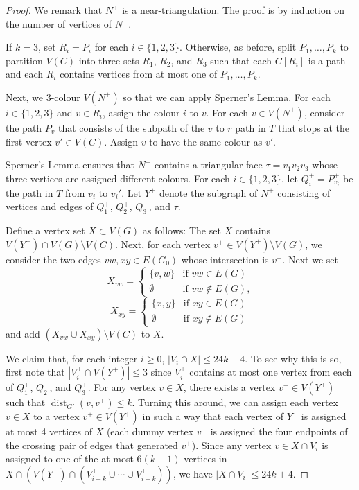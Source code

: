 \documentclass{patmorin}
\DeclareMathOperator{\dist}{dist}
\begin{document}
\begin{proof}
  We remark that $N^+$ is a near-triangulation.
  The proof is by induction on the number of vertices of $N^+$.

  If $k=3$, set $R_i=P_i$ for each $i\in\{1,2,3\}$.  Otherwise, as before, split $P_1,\ldots,P_k$ to partition $V(C)$ into three sets $R_1$, $R_2$, and $R_3$ such that each $C[R_i]$ is a path and each $R_i$ contains vertices from at most one of $P_1,\ldots,P_k$. 
  
  Next, we 3-colour $V(N^+)$ so that we can apply Sperner's Lemma.
  For each $i\in\{1,2,3\}$ and $v\in R_i$, assign the colour $i$ to $v$.
  For each $v\in V(N^+)$, consider the path $P_v$ that consists of the subpath of the $v$ to $r$ path in $T$ that stops at the first vertex $v'\in V(C)$. Assign $v$ to have the same colour as $v'$.
  
  Sperner's Lemma ensures that $N^+$ contains a triangular face $\tau=v_1v_2v_3$ whose three vertices are assigned different colours. For each $i\in\{1,2,3\}$, let $Q_i^+=P_{v_i}^+$ be the path in $T$ from $v_i$ to $v_i'$.  Let $Y^+$ denote the subgraph of $N^+$ consisting of vertices and edges of $Q_1^+$, $Q_2^+$, $Q_3^+$, and $\tau$.
  
  Define a vertex set $X\subset V(G)$ as follows:  The set $X$ contains $V(Y^+)\cap V(G)\setminus V(C)$.  Next, for each vertex $v^+\in V(Y^+)\setminus V(G)$, we consider the two edges $vw,xy\in E(G_0)$ whose intersection is $v^+$.  Next we set
  \[   X_{vw} = \begin{cases} \{v,w\} & \text{if $vw\in E(G)$} \\
           \emptyset & \text{if $vw\not\in E(G)$,}
         \end{cases}
  \]
  \[   X_{xy} = \begin{cases} \{x,y\} & \text{if $xy\in E(G)$} \\
           \emptyset & \text{if $xy\not\in E(G)$} 
         \end{cases}
  \]
  and add $(X_{vw}\cup X_{xy})\setminus V(C)$ to $X$.

  We claim that, for each integer $i\ge 0$, $|V_i\cap X|\le 24k+4$.  To see why this is so, first note that $|V_i^+\cap V(Y^+)|\le 3$ since $V_i^+$ contains at most one vertex from each of $Q_1^+$, $Q_2^+$, and $Q_3^+$. For any vertex $v\in X$, there exists a vertex $v^+\in V(Y^+)$ such that $\dist_{G'}(v,v^+)\le k$.  Turning this around, we can assign each vertex $v\in X$ to a vertex $v^+\in V(Y^+)$ in such a way that each vertex of $Y^+$ is assigned at most 4 vertices of $X$ (each dummy vertex $v^+$ is assigned the four endpoints of the crossing pair of edges that generated $v^+$).  Since any vertex $v\in X\cap V_i$ is assigned to one of the at most $6(k+1)$ vertices in $X\cap (V(Y^+)\cap( V_{i-k}^+\cup\cdots\cup V_{i+k}^+))$, we have $|X\cap V_i|\le 24k+4$.


\end{proof}
\end{document}
